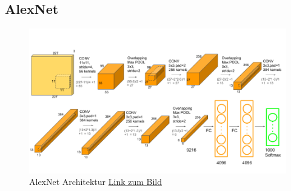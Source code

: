 \documentclass[12pt,a4paper]{scrartcl}
\numberwithin{equation}{section}
\begin{document}
 \subsection{AlexNet}
  \begin{figure}[h]
 	\centering
 	\includegraphics[width=\textwidth ]{AlexNet}
 	\caption{ AlexNet Architektur \href{https://neurohive.io/en/popular-networks/alexnet-imagenet-classification-with-deep-convolutional-neural-networks/}{Link zum Bild} }
 	\label{fig:AlexNet}
 \end{figure}
\end{document}
